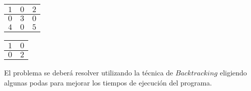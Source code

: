 \documentclass[11pt, a4paper, twoside]{article}
\begin{document}
\begin{itemize}
	\begin{center}
      \begin{minipage}{0.2\textwidth}
          \begin{tabular}{|c|c|c|}
              \hline
               $1$ & $0$ & $2$ \\
              \hline
               $0$ & $3$ & $0$  \\
              \hline 
               $4$ & $0$ & $5$ \\
              \hline
          \end{tabular}
      \end{minipage}
      \begin{minipage}{0.2\textwidth}
          \begin{tabular}{|c|c|}
              \hline
               $1$ & $0$ \\
              \hline
               $0$ & $2$ \\
              \hline
          \end{tabular}
      \end{minipage}
	\end{center}
\end{itemize} 


\begin{center} 

El problema se deberá resolver utilizando la técnica de $Backtracking$ eligiendo
algunas podas para mejorar los tiempos de ejecución del programa.

\end{center}
\end{document}
